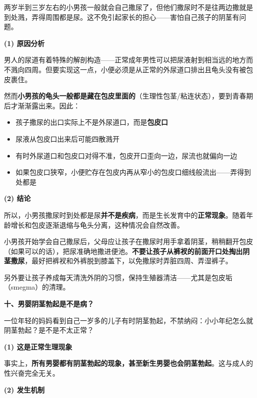两岁半到三岁左右的小男孩一般就会自己撒尿了，但他们撒尿时不是往两边撒就是到处溅，弄得周围都是尿。这不免引起家长的担心——害怕自己孩子的阴茎有问题。

\vspace{0.5em}
\noindent\textbf{(1) 原因分析}

男人的尿道有着特殊的解剖构造——正常成年男性可以把尿液射到相当远的地方而不溅向四周。但要实现这一点，小便必须是从正常的外尿道口排出且龟头没有被包皮裹住。

然而\textbf{小男孩的龟头一般都是藏在包皮里面的}（生理性包茎/粘连状态），要到青春期后才渐渐露出来。因此：
\begin{itemize}
	\item 孩子撒尿的出口实际上不是外尿道口，而是\textbf{包皮口}
	\item 尿液从包皮口出来后可能四散溅开
	\item 有时外尿道口和包皮口对得不准，包皮开口歪向一边，尿流也就偏向一边
	\item 如果包皮口狭窄，小便贮存在包皮内再从窄小的包皮口细线般流出——弄得到处都是
\end{itemize}

\vspace{0.3em}
\noindent\textbf{(2) 结论}

所以，小男孩撒尿时到处都是尿\textbf{并不是疾病}，而是生长发育中的\textbf{正常现象}。随着年龄增长和包皮逐渐退缩与龟头分离，这种情况会自然改善。

\begin{tcolorbox}[colback=pink!5!white,colframe=red!50!black,title=贴心小叮咛]
小男孩开始学会自己撒尿后，父母应让孩子在撒尿时用手拿着阴茎，稍稍翻开包皮（如果可以的话），把尿准确地撒进便池。\textbf{不要让孩子从裤衩的前面开口处掏出阴茎撒尿}，最好把裤衩和外裤脱到膝盖下，以免撒尿时弄脏四周、弄湿裤子。

另外要让孩子养成每天清洗外阴的习惯，保持生殖器清洁——尤其是包皮垢（smegma）的清理。
\end{tcolorbox}

\vspace{0.8em}
\noindent\textbf{十、男婴阴茎勃起是不是病？}

一位年轻的妈妈看到自己一岁多的儿子有时阴茎勃起，不禁纳闷：小小年纪怎么就阴茎勃起？是不是不太正常？

\vspace{0.5em}
\noindent\textbf{(1) 这是正常生理现象}

事实上，\textbf{所有男婴都有阴茎勃起的现象，甚至新生男婴也会阴茎勃起}。这与成人的性兴奋完全无关。

\vspace{0.3em}
\noindent\textbf{(2) 发生机制}

